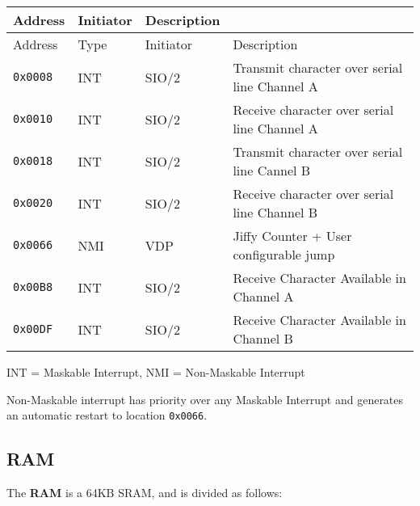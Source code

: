         \begin{longtable}{ |l|l|l|l| }\hline
            \hline
            \rowcolor{lightgray}
            Address & Initiator & Description \\
            \hline
            \hline
            \endfirsthead
    
            \hline
            \rowcolor{lightgray}
            Address & Type & Initiator & Description \\
            \hline
            \hline
            \endhead
    
            \texttt{0x0008} & INT & SIO/2 & Transmit character over serial line Channel A\\
            \hline
            \texttt{0x0010} & INT & SIO/2 & Receive character over serial line Channel A\\
            \hline
            \texttt{0x0018} & INT & SIO/2 & Transmit character over serial line Cannel B\\
            \hline
            \texttt{0x0020} & INT & SIO/2 & Receive character over serial line Channel B\\
            \hline
            \texttt{0x0066} & NMI & VDP & Jiffy Counter + User configurable jump\\
            \hline
            \texttt{0x00B8} & INT & SIO/2 & Receive Character Available in Channel A\\
            \hline
            \texttt{0x00DF} & INT & SIO/2 & Receive Character Available in Channel B\\
            \hline
        \end{longtable}

        INT = Maskable Interrupt, NMI = Non-Maskable Interrupt

        Non-Maskable interrupt has priority over any Maskable Interrupt and
        generates an automatic restart to location \texttt{0x0066}.

    \subsection{RAM}
    \label{subsec:memmap:ram}

    The \textbf{RAM} is a 64KB SRAM, and is divided as follows:

